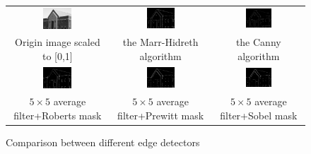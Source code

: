 \documentclass[11pt,a4paper]{article}
\begin{document}
\begin{figure}[!htbp]
	\centering
	\begin{tabular}{ccc} 
		\includegraphics[width=0.3\textwidth]{pro9/10_25_a}&
		\includegraphics[width=0.3\textwidth]{pro9/10_25_c}&
		\includegraphics[width=0.3\textwidth]{pro9/10_25_d}\\
		 Origin image scaled to [0,1]& the Marr-Hidreth algorithm  & the Canny algorithm\\
		\includegraphics[width=0.3\textwidth]{pro9/10_25_roberts}&
		\includegraphics[width=0.3\textwidth]{pro9/10_25_prewitt}&
		\includegraphics[width=0.3\textwidth]{pro9/10_25_b}\\
		$5\times 5$ average filter+Roberts mask& $5\times 5$ average filter+Prewitt mask & $5\times 5$ average filter+Sobel mask
	\end{tabular}
	\caption{Comparison between different edge detectors}
	\label{pro9_fig1}
\end{figure}
\end{document}
